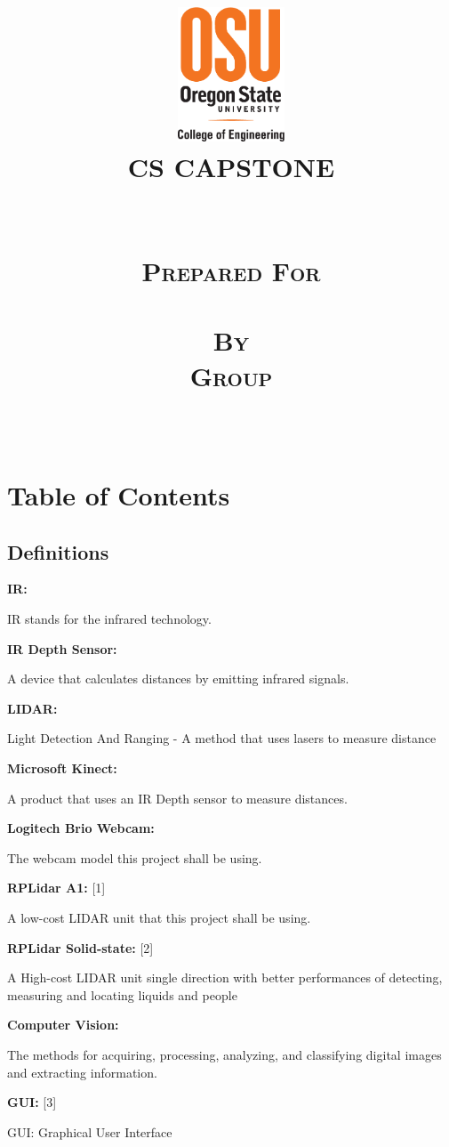 \documentclass[10pt,draftclsnofoot,onecolumn,journal,compsoc]{IEEEtran}
\date{\displaydate{date}}
\title{\centering
			\includegraphics[height=4cm,natwidth=200,natheight=300]{images/osu_logo.png}\\\vspace{.5in}
		\scshape{\huge CS CAPSTONE \DocType \\\vspace{.5in}
		\textbf{\Huge\CapstoneProjectName}\\\vspace{1in}
		\large	\displaydate{date}\\\vspace{.3in}		
			\large {Prepared For}\\\vspace{.1in}
			\textbf{{\Large \CapstoneSponsorPerson}} \\\vspace{.8in}		
				\large {By} \\\vspace{.1in}
				\textbf {Group \CapstoneTeamNumber}\\\vspace{.1in}
				\large {\CapstoneTeamName}\\\vspace{.1in}
				\textbf{ { \GroupMemberTwo}}
}  
}
\begin{document}
 \maketitle
\IEEEdisplaynontitleabstractindextext
\IEEEpeerreviewmaketitle
\newpage
{}
\tableofcontents
\newpage
	
\section{Table of Contents}
\tableofcontents



\begin{singlespace}
	\section{Definitions}
			\textbf{IR: }\label{def:IR}\par
		IR stands for the infrared technology.

		\textbf{IR Depth Sensor: }\label{def:depthsensor}\par
		A device that calculates distances by emitting infrared signals. 
		
		\textbf{LIDAR: }\label{def:lidar}\par
		Light Detection And Ranging - A method that uses lasers to measure distance
		
		\textbf{Microsoft Kinect: }\label{def:kinect}\par
		A product that uses an IR Depth sensor to measure distances.
		
		\textbf{Logitech Brio Webcam: }\label{def:brio}\par
		The webcam model this project shall be using.
		
		\textbf{RPLidar A1: }\label{def:rplidar}[1]\par
		A low-cost LIDAR unit that this project shall be using.
		
		\textbf{RPLidar Solid-state: }\label{def:rplidar2}[2]\par
		A High-cost LIDAR unit single direction with better performances of detecting, measuring and locating liquids and people
		
		\textbf{Computer Vision: }\label{def:vision}\par
		The methods for acquiring, processing, analyzing, and classifying digital images and extracting information.
		
		\textbf{GUI: }\label{def:gui}[3]\par
		GUI: Graphical User Interface
		

\end{singlespace}
\end{document}
